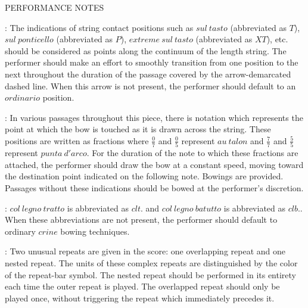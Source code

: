 \documentclass[11pt]{article}
\newcommand*\circled[1]{\tikz[baseline=(char.base)]{
            \node[shape=circle,draw,inner sep=1pt] (char) {#1};}}
\begin{document}
\begin{center}
\huge PERFORMANCE NOTES
\end{center}
\begingroup
\begin{center}

 : The indications of string contact positions such as $sul \ tasto$ (abbreviated as $T$), $sul \ ponticello$ (abbreviated as $P$), $extreme \ sul \ tasto$ (abbreviated as $XT$), etc. should be considered as points along the continuum of the length string. The performer should make an effort to smoothly transition from one position to the next throughout the duration of the passage covered by the arrow-demarcated dashed line. When this arrow is not present, the performer should default to an $ordinario$ position.
\rightskip\leftskip
\phantom{text} \hfill \phantom{()}

 : In various passages throughout this piece, there is notation which represents the point at which the bow is touched as it is drawn across the string. These positions are written as fractions where \( \frac{0}{7} \) and  \( \frac{0}{5} \) represent $au \ talon$ and \( \frac{7}{7} \) and \( \frac{5}{5} \) represent $punta \ d'arco$. For the duration of the note to which these fractions are attached, the performer should draw the bow at a constant speed, moving toward the destination point indicated on the following note. Bowings are provided. Passages without these indications should be bowed at the performer's discretion.
\rightskip\leftskip
\phantom{text} \hfill \phantom{()}

 : \circled{1} $col \ legno \ tratto$ is abbreviated as $clt.$ and \circled{2} $col \ legno \ batutto$ is abbreviated as $clb.$. When these abbreviations are not present, the performer should default to ordinary $crine$ bowing techniques.
\rightskip\leftskip
\phantom{text} \hfill \phantom{()}

 : Two unusual repeats are given in the score: one overlapping repeat and one nested repeat. The units of these complex repeats are distinguished by the color of the repeat-bar symbol. The nested repeat should be performed in its entirety each time the outer repeat is played. The overlapped repeat should only be played once, without triggering the repeat which immediately precedes it.
\rightskip\leftskip
\phantom{text} \hfill \phantom{()}


\end{center}
\end{document}
